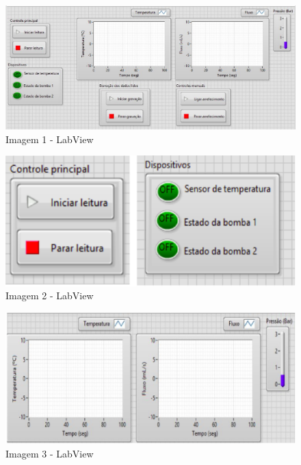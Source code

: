 \newpage\begin{figure}[!htb]                                                               
    \centering                                                                      
    \includegraphics[scale=0.6, keepaspectratio=true]{figuras/labview_1.eps} 
    \caption{Imagem 1 - LabView}
 \end{figure}
 \begin{figure}[!htb]                                                               
    \centering                                                                      
    \includegraphics[scale=0.5, keepaspectratio=true]{figuras/labview_2.eps} 
    \caption{Imagem 2 - LabView}
 \end{figure}
 \begin{figure}[!htb]                                                               
    \centering                                                                      
    \includegraphics[scale=0.5, keepaspectratio=true]{figuras/labview_3.eps} 
    \caption{Imagem 3 - LabView}
 \end{figure}
 


